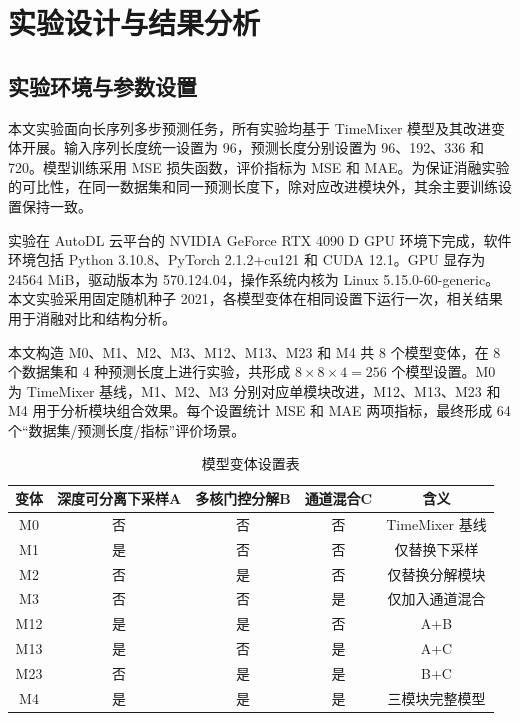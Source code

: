 
\chapter{实验设计与结果分析}

\section{实验环境与参数设置}

本文实验面向长序列多步预测任务，所有实验均基于 TimeMixer 模型及其改进变体开展。输入序列长度统一设置为 96，预测长度分别设置为 96、192、336 和 720。模型训练采用 MSE 损失函数，评价指标为 MSE 和 MAE。为保证消融实验的可比性，在同一数据集和同一预测长度下，除对应改进模块外，其余主要训练设置保持一致。

实验在 AutoDL 云平台的 NVIDIA GeForce RTX 4090 D GPU 环境下完成，软件环境包括 Python 3.10.8、PyTorch 2.1.2+cu121\cite{paszke2019pytorch} 和 CUDA 12.1。GPU 显存为 24564 MiB，驱动版本为 570.124.04，操作系统内核为 Linux 5.15.0-60-generic。本文实验采用固定随机种子 2021，各模型变体在相同设置下运行一次，相关结果用于消融对比和结构分析。

本文构造 M0、M1、M2、M3、M12、M13、M23 和 M4 共 8 个模型变体，在 8 个数据集和 4 种预测长度上进行实验，共形成 $8 \times 8 \times 4 = 256$ 个模型设置。M0 为 TimeMixer 基线，M1、M2、M3 分别对应单模块改进，M12、M13、M23 和 M4 用于分析模块组合效果。每个设置统计 MSE 和 MAE 两项指标，最终形成 64 个“数据集/预测长度/指标”评价场景。

\begin{table}[htbp]
    \centering
    \caption{模型变体设置表}
    \label{tab:variants}
    \begin{tabular*}{\textwidth}{@{\extracolsep{\fill}}ccccc@{}}
        \toprule
        变体 & 深度可分离下采样A & 多核门控分解B & 通道混合C & 含义 \\
        \midrule
        M0 & 否 & 否 & 否 & TimeMixer 基线 \\
        M1 & 是 & 否 & 否 & 仅替换下采样 \\
        M2 & 否 & 是 & 否 & 仅替换分解模块 \\
        M3 & 否 & 否 & 是 & 仅加入通道混合 \\
        M12 & 是 & 是 & 否 & A+B \\
        M13 & 是 & 否 & 是 & A+C \\
        M23 & 否 & 是 & 是 & B+C \\
        M4 & 是 & 是 & 是 & 三模块完整模型 \\
        \bottomrule
    \end{tabular*}
\end{table}

